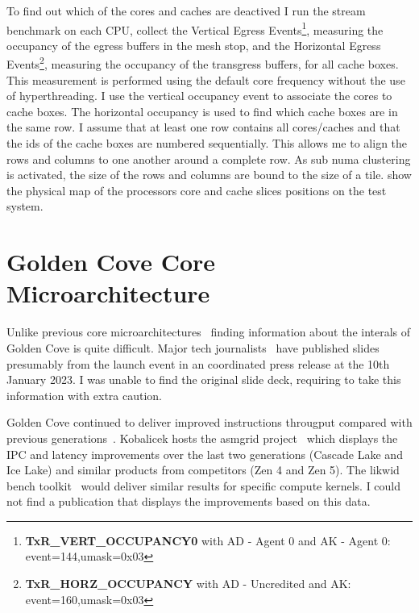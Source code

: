To find out which of the cores and caches are deactived I run the stream benchmark on each CPU, collect the Vertical Egress Events\footnote{\textbf{TxR\_VERT\_OCCUPANCY0} with AD - Agent 0 and AK - Agent 0: event=144,umask=0x03}, measuring the occupancy of the egress buffers in the mesh stop, and the Horizontal Egress Events\footnote{\textbf{TxR\_HORZ\_OCCUPANCY} with AD - Uncredited and AK: event=160,umask=0x03}, measuring the occupancy of the transgress buffers, for all cache boxes.
This measurement is performed using the default core frequency without the use of hyperthreading.
I use the vertical occupancy event to associate the cores to cache boxes.
The horizontal occupancy is used to find which cache boxes are in the same row.
I assume that at least one row contains all cores/caches and that the ids of the cache boxes are numbered sequentially.
This allows me to align the rows and columns to one another around a complete row.
As sub numa clustering is activated, the size of the rows and columns are bound to the size of a tile.
 show the physical map of the processors core and cache slices positions on the test system.


\section{Golden Cove Core Microarchitecture}

Unlike previous core microarchitectures~\cite{Intel_2020_Skylake_SP,Intel_2020_IceLake_SP} finding information about the interals of Golden Cove is quite difficult.
Major tech journalists~\cite{ServerTheHome_2023_SPR_Press,TechGage_2023_SPR_Press,HotHardware_2023_SPR_Press,Wccftech_2023_SPR_Press} have published slides presumably from the launch event in an coordinated press release at the 10th January 2023.
I was unable to find the original slide deck, requiring to take this information with extra caution.

Golden Cove continued to deliver improved instructions througput compared with previous generations~\cite{Intel_2021_Architecture_Day}.
Kobalicek hosts the asmgrid project~\cite{Kobalicek_AsmGrid} which displays the IPC and latency improvements over the last two generations (Cascade Lake and Ice Lake) and similar products from competitors (Zen 4 and Zen 5).
The likwid bench toolkit~\cite{RHZE_HPC_likwid} would deliver similar results for specific compute kernels.
I could not find a publication that displays the improvements based on this data.

